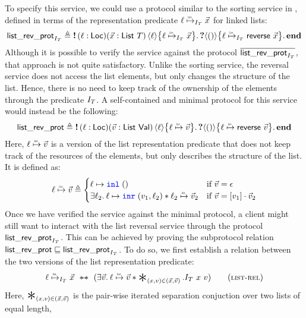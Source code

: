 To specify this service, we could use a protocol similar to the sorting service
in , defined in terms of the
representation predicate $\listrefI{\interpvar_\tvar}{\loc}{\vec{\var}}$ for
linked lists:
\[
\listrevprotname_{\interpvar_\tvar} \eqdef{}
  \sendprot{(\loc:\Loc)(\vec{\var}:\List\ \tvar)}{\loc}
    {\listrefI{\interpvar_\tvar}{\loc}{\vec{\var}}}
  \recvprot{}{\TT}
    {\listrefI{\interpvar_\tvar}{\loc}{\listrev{\vec{\var}}}}
  \protend
\]
Although it is possible to verify the service against the protocol
$\overline{\mathsf{list\_rev\_prot}_{I_T}}$, that approach is not quite satisfactory.
Unlike the sorting service, the reversal service does not access the list
elements, but only changes the structure of the list.
Hence, there is no need to keep track of the ownership of the elements through
the predicate $I_T$.
A self-contained and minimal protocol for this service would instead be the
following:
\[
\listrevprotname \eqdef{}
  \sendprot{(\loc:\Loc)(\vec{\val}:\List\ \Val)}{\loc}{\listref{\loc}{\vec{\val}}}
  \recvprot{}{\TT}{\listref{\loc}{\listrev{\vec{\val}}}}
  \protend
\]
Here, $\listref{\loc}{\vec{\val}}$ is a version of the list representation
predicate that does not keep track of the resources of the elements, but only
describes the structure of the list.
It is defined as:
\begin{equation*}
\listref \loc {\vec \val} \eqdef
  \begin{cases}
  \loc \mapsto \Inl\;\TT & \textnormal{if $\vec\val = \nil$} \\
  \Exists \loc_2.
    \loc \mapsto \Inr\;(\val_1,\loc_2) \ast
    \listref {\loc_2} {\vec\val_2}
    & \textnormal{if $\vec\val = [\val_1] \cdot \vec\val_2$}
  \end{cases}
\end{equation*}
Once we have verified the service against the minimal protocol, a client might
still want to interact with the list reversal
service through the protocol $\mathsf{list\_rev\_prot}_{I_T}$.
This can be achieved by proving the subprotocol relation
$\mathsf{list\_rev\_prot} \sqsubseteq \mathsf{list\_rev\_prot}_{I_T}$.
To do so, we first establish a relation between the two versions
of the list representation predicate:
\[
  \textstyle
  \listrefI{\interpvar_\tvar}{\loc}{\vec{\var}} \ \wandIff \
  (\Exists \vec{\val}.
  \listref{\loc}{\vec{\val}} \ast
  \Sep_{(\var,\val) \in (\vec{\var},\vec{\val})}.
  \interpvar_\tvar\ \var\ \val)
  \tagH{list-rel}
\]
Here, $\Sep_{(\var,\val) \in (\vec{\var},\vec{\val})}$ is the pair-wise iterated
separation conjuction over two lists of equal length,
